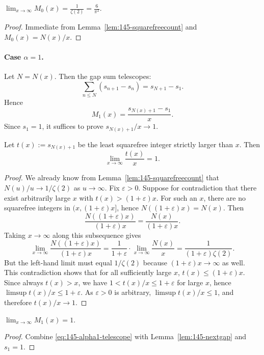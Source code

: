 \begin{corollary}[Limit for $\alpha=0$]
\label{cor:145-alpha0}
$\displaystyle \lim_{x\to\infty} M_0(x)=\frac{1}{\zeta(2)}=\frac{6}{\pi^2}$.
\end{corollary}
\begin{proof}
Immediate from Lemma~\ref{lem:145-squarefreecount} and $M_0(x)=N(x)/x$.
\end{proof}

\paragraph{Case $\alpha=1$.}
Let $N=N(x)$. Then the gap sum telescopes:
\[
\sum_{n\le N}(s_{n+1}-s_n)=s_{N+1}-s_1.
\]
Hence
\begin{equation}
\label{eq:145-alpha1-telescope}
M_1(x)=\frac{s_{N(x)+1}-s_1}{x}.
\end{equation}
Since $s_1=1$, it suffices to prove $s_{N(x)+1}/x\to 1$.

\begin{lemma}
\label{lem:145-nextgap}
Let $t(x):=s_{N(x)+1}$ be the least squarefree integer strictly larger than $x$. Then
\[
\lim_{x\to\infty}\frac{t(x)}{x}=1.
\]
\end{lemma}
\begin{proof}
We already know from Lemma~\ref{lem:145-squarefreecount} that $N(u)/u\to 1/\zeta(2)$ as $u\to\infty$.
Fix $\varepsilon>0$. Suppose for contradiction that there exist arbitrarily large $x$ with $t(x)>(1+\varepsilon)x$.
For such an $x$, there are no squarefree integers in $(x,(1+\varepsilon)x]$, hence $N((1+\varepsilon)x)=N(x)$.
Then
\[
\frac{N((1+\varepsilon)x)}{(1+\varepsilon)x}=\frac{N(x)}{(1+\varepsilon)x}.
\]
Taking $x\to\infty$ along this subsequence gives
\[
\lim_{x\to\infty}\frac{N((1+\varepsilon)x)}{(1+\varepsilon)x}=\frac{1}{1+\varepsilon}\cdot \lim_{x\to\infty}\frac{N(x)}{x}=\frac{1}{(1+\varepsilon)\zeta(2)}.
\]
But the left-hand limit must equal $1/\zeta(2)$ because $(1+\varepsilon)x\to\infty$ as well. This contradiction shows that for all sufficiently large $x$, $t(x)\le (1+\varepsilon)x$.
Since always $t(x)>x$, we have $1< t(x)/x\le 1+\varepsilon$ for large $x$, hence $\limsup t(x)/x\le 1+\varepsilon$.
As $\varepsilon>0$ is arbitrary, $\limsup t(x)/x\le 1$, and therefore $t(x)/x\to 1$.
\end{proof}

\begin{corollary}[Limit for $\alpha=1$]
\label{cor:145-alpha1}
$\displaystyle \lim_{x\to\infty} M_1(x)=1$.
\end{corollary}
\begin{proof}
Combine \eqref{eq:145-alpha1-telescope} with Lemma~\ref{lem:145-nextgap} and $s_1=1$.
\end{proof}

